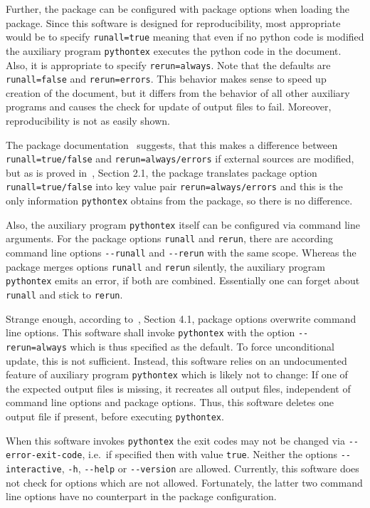 Further, the package  can be configured with package options when loading the package. 
Since this software is designed for reproducibility, 
most appropriate would be to specify \texttt{runall=true} meaning that even if no python code is modified 
the auxiliary program \texttt{pythontex} executes the python code in the document. 
Also, it is appropriate to specify \texttt{rerun=always}. 
Note that the defaults are \texttt{runall=false} and \texttt{rerun=errors}. 
This behavior makes sense to speed up creation of the document, 
but it differs from the behavior of all other auxiliary programs 
and causes the check for update of output files to fail. 
Moreover, reproducibility is not as easily shown. 

The package documentation~\cite{PythonTexP} suggests, 
that this makes a difference between \texttt{runall=true/false} 
and \texttt{rerun=always/errors} if external sources are modified, 
but as is proved in~\cite{PyTexInOut}, Section 2.1, 
the package translates package option \texttt{runall=true/false} into key value pair \texttt{rerun=always/errors} 
and this is the only information \texttt{pythontex} obtains from the package, 
so there is no difference. 

Also, the auxiliary program \texttt{pythontex} itself can be configured via command line arguments. 
For the package options \texttt{runall} and \texttt{rerun}, 
there are according command line options \texttt{-{}-runall} and \texttt{-{}-rerun} with the same scope. 
Whereas the package merges options \texttt{runall} and \texttt{rerun} silently, 
the auxiliary program \texttt{pythontex} emits an error, if both are combined. 
Essentially one can forget about \texttt{runall} and stick to \texttt{rerun}. 

Strange enough, according to~\cite{PythonTexP}, Section 4.1, package options overwrite command line options. 
This software shall invoke \texttt{pythontex} 
with the option \texttt{-{}-rerun=always} which is thus specified as the default. 
To force unconditional update, this is not sufficient. 
Instead, this software relies on an undocumented feature of auxiliary program \texttt{pythontex} 
which is likely not to change: 
If one of the expected output files is missing, it recreates all output files, independent of command line options and package options. 
Thus, this software deletes one output file if present, before executing \texttt{pythontex}. 

When this software invokes \texttt{pythontex} 
the exit codes may not be changed via \texttt{-{}-error-exit-code}, 
i.e.~if specified then with value \texttt{true}. 
Neither the options \texttt{-{}-interactive}, \texttt{-h}, \texttt{-{}-help} or \texttt{-{}-version} are allowed. 
Currently, this software does not check for options which are not allowed. 
Fortunately, the latter two command line options have no counterpart in the package configuration. 




